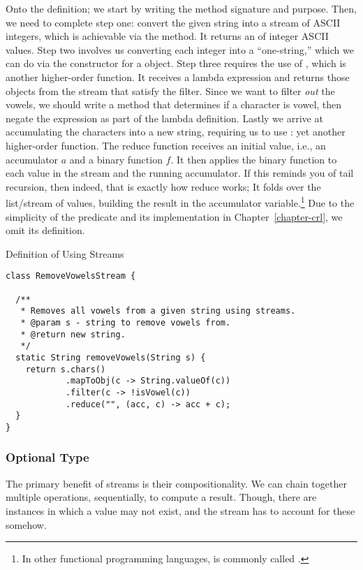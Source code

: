 Onto the definition; we start by writing the method signature and purpose. Then, we need to complete step one: convert the given string into a stream of ASCII integers, which is achievable via the  method. It returns an  of integer ASCII values. Step two involves us converting each integer into a ``one-string,'' which we can do via the constructor for a  object. Step three requires the use of , which is another higher-order function. It receives a lambda expression and returns those objects from the stream that satisfy the filter. Since we want to filter \textit{out} the vowels, we should write a method that determines if a character is vowel, then negate the expression as part of the lambda definition. Lastly we arrive at accumulating the characters into a new string, requiring us to use : yet another higher-order function. The reduce function receives an initial value, i.e., an accumulator $a$ and a binary function $f$. It then applies the binary function to each value in the stream and the running accumulator. If this reminds you of tail recursion, then indeed, that is exactly how reduce works; It folds over the list/stream of values, building the result in the accumulator variable.\footnote{In other functional programming languages,  is commonly called .} Due to the simplicity of the  predicate and its implementation in Chapter~\ref{chapter-crl}, we omit its definition.

\begin{cl}[]{Definition of  Using Streams}
\begin{lstlisting}[language=MyJava]
class RemoveVowelsStream {

  /**
   * Removes all vowels from a given string using streams.
   * @param s - string to remove vowels from.
   * @return new string.
   */
  static String removeVowels(String s) {
    return s.chars()
            .mapToObj(c -> String.valueOf(c))
            .filter(c -> !isVowel(c))
            .reduce("", (acc, c) -> acc + c);
  }
}
\end{lstlisting}
\end{cl}

\subsubsection*{Optional Type}
The primary benefit of streams is their compositionality. We can chain together multiple operations, sequentially, to compute a result. Though, there are instances in which a value may not exist, and the stream has to account for these somehow.

